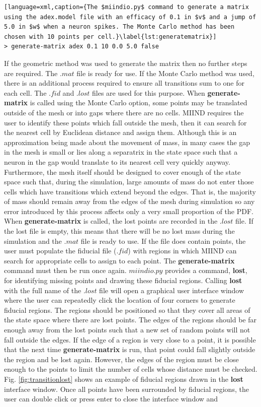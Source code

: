\documentclass[utf8]{frontiersSCNS} %
\begin{document}
\begin{lstlisting}[language=xml,caption={The $miindio.py$ command to generate a matrix using the adex.model file with an efficacy of 0.1 in $v$ and a jump of 5.0 in $w$ when a neuron spikes. The Monte Carlo method has been chosen with 10 points per cell.}\label{lst:generatematrix}]
> generate-matrix adex 0.1 10 0.0 5.0 false
\end{lstlisting}

If the geometric method was used to generate the matrix then no further steps are required. The $.mat$ file is ready for use. If the Monte Carlo method was used, there is an additional process required to ensure all transitions sum to one for each cell. The $.fid$ and $.lost$ files are used for this purpose. When \textbf{generate-matrix} is called using the Monte Carlo option, some points may be translated outside of the mesh or into gaps where there are no cells. MIIND requires the user to identify these points which fall outside the mesh, then it can search for the nearest cell by Euclidean distance and assign them. Although this is an approximation being made about the movement of mass, in many cases the gap in the mesh is small or lies along a separatrix in the state space such that a neuron in the gap would translate to its nearest cell very quickly anyway. Furthermore, the mesh itself should be designed to cover enough of the state space such that, during the simulation, large amounts of mass do not enter those cells which have transitions which extend beyond the edges. That is, the majority of mass should remain away from the edges of the mesh during simulation so any error introduced by this process affects only a very small proportion of the PDF. When \textbf{generate-matrix} is called, the lost points are recorded in the $.lost$ file. If the lost file is empty, this means that there will be no lost mass during the simulation and the $.mat$ file is ready to use. If the file does contain points, the user must populate the fiducial file ($.fid$) with regions in which MIIND can search for appropriate cells to assign to each point. The \textbf{generate-matrix} command must then be run once again. $miindio.py$ provides a command, \textbf{lost}, for identifying missing points and drawing these fiducial regions. Calling \textbf{lost} with the full name of the $.lost$ file will open a graphical user interface window where the user can repeatedly click the location of four corners to generate fiducial regions. The regions should be positioned so that they cover all areas of the state space where there are lost points. The edges of the regions should be far enough away from the lost points such that a new set of random points will not fall outside the edges. If the edge of a region is very close to a point, it is possible that the next time \textbf{generate-matrix} is run, that point could fall slightly outside the region and be lost again. However, the edges of the region must be close enough to the points to limit the number of cells whose distance must be checked. Fig. \ref{fig:transitionlost} shows an example of fiducial regions drawn in the \textbf{lost} interface window. Once all points have been surrounded by fiducial regions, the user can double click or press enter to close the interface window and 
\end{document}
